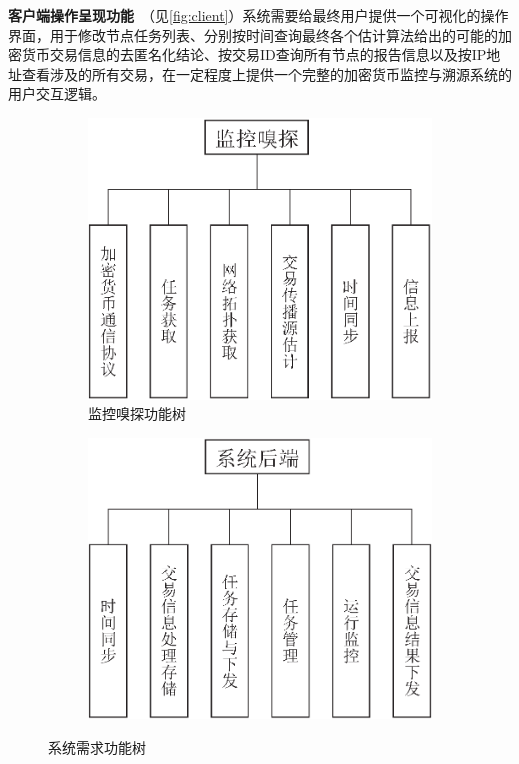 \documentclass[supercite]{HustGraduPaper}
\newcommand{\xfig}[3]{
  \begin{figure}[htb]
    \centering
    #3
    \caption{#2}
    \label{fig:#1}
  \end{figure}
}
\newcommand{\rfig}[1]{\autoref{fig:#1}}
\theoremstyle{definition}
\begin{document}
\textbf{客户端操作呈现功能}\ （见\rfig{client}）系统需要给最终用户提供一个可视化的操作界面，用于修改节点任务列表、分别按时间查询最终各个估计算法给出的可能的加密货币交易信息的去匿名化结论、按交易ID查询所有节点的报告信息以及按IP地址查看涉及的所有交易，在一定程度上提供一个完整的加密货币监控与溯源系统的用户交互逻辑。
\xfig{system-requirements}{系统需求功能树}{
  \begin{subfigure}[b]{0.54\textwidth}
    \includegraphics[width=\textwidth]{images/2.1-sniffer.ps}
    \caption{监控嗅探功能树}
    \label{fig:sniffer}
  \end{subfigure}
  \begin{subfigure}[b]{0.54\textwidth}
    \includegraphics[width=\textwidth]{images/2.1-backend.ps}

\end{subfigure}}
\end{document}
